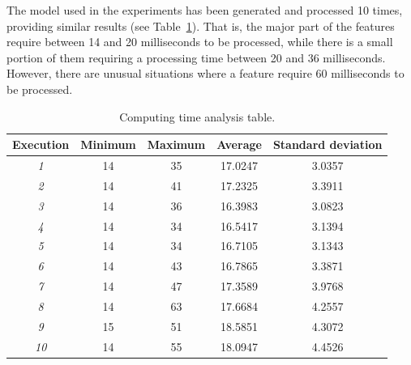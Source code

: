 The model used in the experiments has been generated and processed 10 times, providing similar results
(see Table~\ref{execution_times}). That is, the
major part of the features require between 14 and 20 milliseconds to be processed, while there is a small
portion of them requiring a processing time between 20 and 36 milliseconds. However, there are unusual situations
where a feature require 60 milliseconds to be processed.

\begin{table}[h]
        \centering
        \begin{tabular}{|c|c|c|c|c|}
                \hline
                \textbf{Execution} & \textbf{Minimum} &  \textbf{Maximum} &  \textbf{Average} &  \textbf{Standard deviation} \\ \hline
                \textit{1}              & 14    & 35    & 17.0247       & 3.0357        \\ \hline
                \textit{2}              & 14    & 41    & 17.2325       & 3.3911        \\ \hline
                \textit{3}              & 14    & 36    & 16.3983       & 3.0823        \\ \hline
                \textit{4}              & 14    & 34    & 16.5417       & 3.1394        \\ \hline
                \textit{5}              & 14    & 34    & 16.7105       & 3.1343        \\ \hline
                \textit{6}              & 14    & 43    & 16.7865       & 3.3871        \\ \hline
                \textit{7}              & 14    & 47    & 17.3589       & 3.9768        \\ \hline
                \textit{8}              & 14    & 63    & 17.6684       & 4.2557        \\ \hline
                \textit{9}              & 15    & 51    & 18.5851       & 4.3072        \\ \hline
                \textit{10}             & 14    & 55    & 18.0947       & 4.4526        \\ \hline
        \end{tabular}
        \caption{Computing time analysis table.}
        \label{execution_times}
\end{table}

